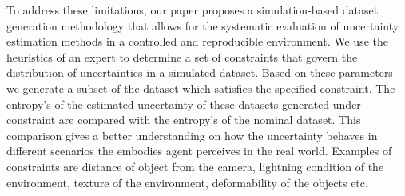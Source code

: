 %
%
To address these limitations, our paper proposes a simulation-based
dataset generation methodology that allows for the systematic evaluation
of uncertainty estimation methods in a controlled and reproducible
environment. We use the heuristics of an expert to determine a set of
constraints that govern the distribution of uncertainties in a simulated
dataset. Based on these parameters we generate a subset of the dataset
which satisfies the specified constraint. The entropy's of the estimated
uncertainty of these datasets generated under constraint are compared
with the entropy's of the nominal dataset. This comparison gives a
better understanding on how the uncertainty behaves in different
scenarios the embodies agent perceives in the real world. Examples of
constraints are distance of object from the camera, lightning condition
of the environment, texture of the environment, deformability of the
objects etc. 

